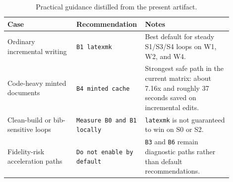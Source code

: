 \begin{table}[t]
\centering
\caption{Practical guidance distilled from the present artifact.}
\label{tab:practical-guidance}
\small
\begin{tabular}{p{0.30\linewidth}p{0.22\linewidth}p{0.38\linewidth}}
\toprule
Case & Recommendation & Notes \\
\midrule
Ordinary incremental writing & \texttt{B1 latexmk} & Best default for steady S1/S3/S4 loops on W1, W2, and W4. \\
Code-heavy minted documents & \texttt{B4 minted cache} & Strongest safe path in the current matrix: about 7.16x and roughly 37 seconds saved on incremental edits. \\
Clean-build or bib-sensitive loops & \texttt{Measure B0 and B1 locally} & \texttt{latexmk} is not guaranteed to win on S0 or S2. \\
Fidelity-risk acceleration paths & \texttt{Do not enable by default} & \texttt{B3} and \texttt{B6} remain diagnostic paths rather than default recommendations. \\
\bottomrule
\end{tabular}
\end{table}
